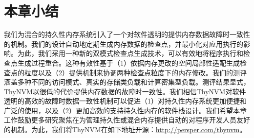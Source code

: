 \section{本章小结}

我们为混合的持久性内存系统引入了一个对软件透明的提供内存数据故障时一致性的机制。我们的设计自动地定期生成内存数据的检查点，并最小化对应用执行的影响。为此，我们采用一种新的双模式检查点生成技术，可以有效地将程序执行和检查点生成过程重合。这种有效性基于（1）依据内存更改的空间局部性适配生成检查点的粒度以及（2）提供机制来协调两种检查点粒度下的内存修改。我们的测评涵盖多种不同的访问模式、真实的存储类负载和计算密集型负载。测评结果显式，ThyNVM以很低的代价提供内存数据的故障时一致性。我们相信ThyNVM对软件透明的高效的故障时数据一致性机制可以促进（1）对持久性内存系统更加便捷和广泛的使用，以及（2）更加高效的支持持久性内存的软件栈设计。我们希望本章工作鼓励更多研究聚焦在为管理持久性或混合内存提供自动的对程序开发人员友好的机制。为此，我们将ThyNVM在如下地址开源：\url{http://persper.com/thynvm}。


